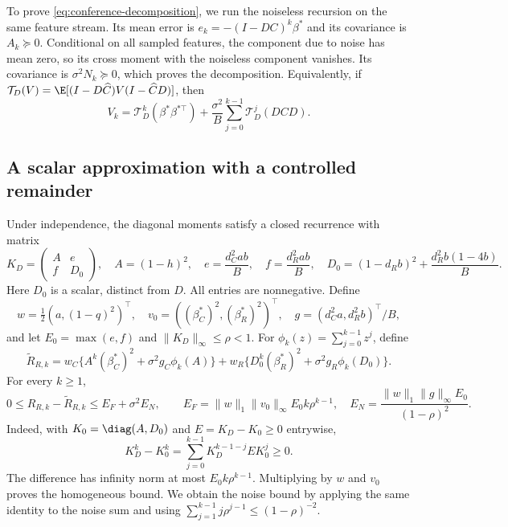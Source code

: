 To prove \eqref{eq:conference-decomposition}, we run the noiseless recursion on
the same feature stream. Its mean error is $e_k = -(I - DC)^k\beta^*$ and its
covariance is $A_k \succeq 0$. Conditional on all sampled features, the
component due to noise has mean zero, so its cross moment with the noiseless
component vanishes. Its covariance is $\sigma^2N_k \succeq 0$, which proves the
decomposition. Equivalently, if
$\mathcal T_D(V) = \E[(I-D\widehat C)V(I-\widehat CD)]$, then
\[
 V_k = \mathcal T_D^k(\beta^*\beta^{*\top})
       + \frac{\sigma^2}{B}\sum_{j=0}^{k-1}\mathcal T_D^j(DCD).
\]

\subsection{A scalar approximation with a controlled remainder}

Under independence, the diagonal moments satisfy a closed recurrence with matrix
\[
 K_D = \begin{pmatrix}
        A & e   \\
        f & D_0
       \end{pmatrix},\quad A
     = (1 - h)^2,\quad e
     = \frac{d_C^2ab}{B},\quad f
     = \frac{d_R^2ab}{B},\quad D_0
     = (1 - d_Rb)^2 + \frac{d_R^2b(1 - 4b)}B.
\]
Here $D_0$ is a scalar, distinct from $D$. All entries are nonnegative. Define
\[
 w = \tfrac12(a,(1 - q)^2)^\top,\quad v_0
   = ((\beta_C^*)^2,(\beta_R^*)^2)^\top,\quad g
   = (d_C^2a,d_R^2b)^\top/B,
\]
and let $E_0 = \max(e,f)$ and $\|K_D\|_\infty \leq \rho < 1$. For
$\phi_k(z) = \sum_{j=0}^{k-1}z^j$, define
\[
 \widetilde R_{R,k} = w_C\{A^k(\beta_C^*)^2 + \sigma^2g_C\phi_k(A)\}
                      + w_R\{D_0^k(\beta_R^*)^2 + \sigma^2g_R\phi_k(D_0)\}.
\]
For every $k \geq 1$,
\begin{equation}
 0
 \leq R_{R,k} - \widetilde R_{R,k}
 \leq E_F + \sigma^2E_N,\qquad E_F
 = \|w\|_1\|v_0\|_\infty E_0k\rho^{k-1},\quad E_N
 = \frac{\|w\|_1\|g\|_\infty E_0}{(1 - \rho)^2}. \label{eq:comparison-remainder}
\end{equation}
Indeed, with $K_0 = \diag(A,D_0)$ and $E = K_D - K_0 \geq 0$ entrywise,
\[
 K_D^k - K_0^k = \sum_{j=0}^{k-1}K_D^{k-1-j}EK_0^j \geq 0.
\]
The difference has infinity norm at most $E_0k\rho^{k-1}$. Multiplying by $w$
and $v_0$ proves the homogeneous bound. We obtain the noise bound by applying
the same identity to the noise sum and using
$\sum_{j=1}^{k-1}j\rho^{j-1} \leq (1 - \rho)^{-2}$.

